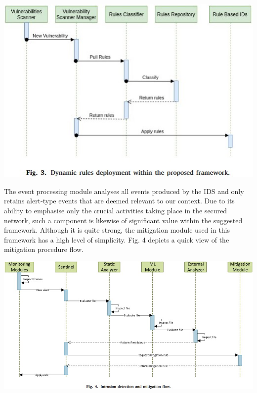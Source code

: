 \documentclass[12pt]{report}
\begin{document}
\begin{center}
\includegraphics[scale=1]{Fig3.jpg}\\
\end{center}

\noindent
The event processing module analyses all events produced by the IDS and only retains alert-type events that are deemed relevant to our context. Due to its ability to emphasise only the crucial activities taking place in the secured network, such a component is likewise of significant value within the suggested framework. Although it is quite strong, the mitigation module used in this framework has a high level of simplicity. Fig. 4 depicts a quick view of the mitigation procedure flow.

\begin{center}
\includegraphics[scale=0.6]{Fig4.jpg}\\
\end{center}
\end{document}
